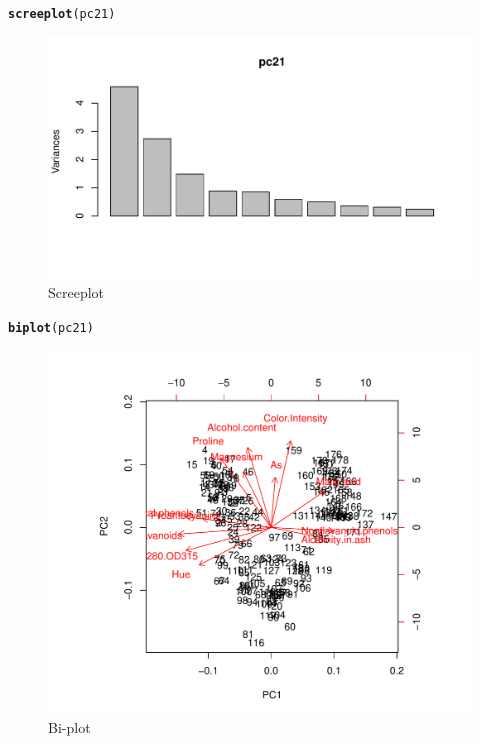\documentclass[12pt, leqno]{article}\usepackage[]{graphicx}\usepackage[]{color}
\makeatletter
\def\maxwidth{ %
  \ifdim\Gin@nat@width>\linewidth
    \linewidth
  \else
    \Gin@nat@width
  \fi
}
\newcommand{\hlstd}[1]{\textcolor[rgb]{0.345,0.345,0.345}{#1}}%
\newcommand{\hlkwd}[1]{\textcolor[rgb]{0.737,0.353,0.396}{\textbf{#1}}}%
\newenvironment{kframe}{%
 \def\at@end@of@kframe{}%
 \ifinner\ifhmode%
  \def\at@end@of@kframe{\end{minipage}}%
  \begin{minipage}{\columnwidth}%
 \fi\fi%
 \def\FrameCommand##1{\hskip\@totalleftmargin \hskip-\fboxsep
 \colorbox{shadecolor}{##1}\hskip-\fboxsep
     \hskip-\linewidth \hskip-\@totalleftmargin \hskip\columnwidth}%
 \MakeFramed {\advance\hsize-\width
   \@totalleftmargin\z@ \linewidth\hsize
   \@setminipage}}%
 {\par\unskip\endMakeFramed%
 \at@end@of@kframe}
\newenvironment{knitrout}{}{} %
\makeatother
\begin{document}
\begin{knitrout}
\color{fgcolor}\begin{kframe}
\begin{alltt}
\hlkwd{screeplot}\hlstd{(pc21)}
\end{alltt}
\end{kframe}\begin{figure}[H]
\includegraphics[width=\maxwidth]{figure/p2b-1} \caption[Screeplot]{Screeplot}\label{fig:p2b}
\end{figure}


\end{knitrout}


\begin{knitrout}
\color{fgcolor}\begin{kframe}
\begin{alltt}
\hlkwd{biplot}\hlstd{(pc21)}
\end{alltt}
\end{kframe}\begin{figure}[H]
\includegraphics[width=\maxwidth]{figure/p2c-1} \caption[Bi-plot]{Bi-plot}\label{fig:p2c}
\end{figure}


\end{knitrout}
\end{document}
